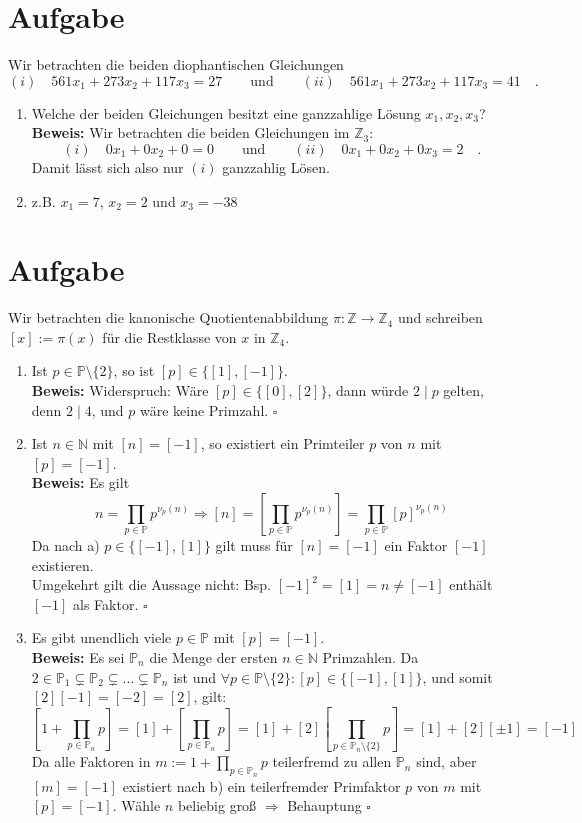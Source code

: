 \documentclass[12pt, a4paper]{article}
\newcommand{\ex}{\section{Aufgabe}}
\renewcommand{\P}{\mathbb{P}}
\begin{document}
	\ex
		Wir betrachten die beiden diophantischen Gleichungen
		\[
			(i)\quad 561x_1 + 273x_2 + 117x_3 = 27 \qquad \text{und} \qquad (ii)\quad 561x_1 + 273x_2 + 117x_3 = 41\quad.
		\]
		\begin{enumerate}[label=\alph*), labelwidth=!, labelindent=0pt]
			\item Welche der beiden Gleichungen besitzt eine ganzzahlige Lösung $x_1, x_2, x_3$?\\
				\textbf{Beweis:} Wir betrachten die beiden Gleichungen im $\mathbb{Z}_3$:
				\[
					(i)\quad 0x_1 + 0x_2 + 0 = 0 \qquad \text{und} \qquad (ii) \quad  0x_1 + 0x_2 + 0x_3 = 2\quad.
				\]
				Damit lässt sich also nur $(i)$ ganzzahlig Lösen.
			\item z.B. $x_1 = 7$, $x_2 = 2$ und $x_3 = -38$
		\end{enumerate}

	\ex
		Wir betrachten die kanonische Quotientenabbildung $\pi : \mathbb{Z} \to \mathbb{Z}_4$ und schreiben $[x] := \pi(x)$  für die Restklasse von $x$ in $\mathbb{Z}_4$.
		\begin{enumerate}[label=\alph*), labelwidth=!, labelindent=0pt]
			\item Ist $p \in \P \setminus \{2\}$, so ist $[p] \in \{[1], [-1]\}$.\\
			\textbf{Beweis:} Widerspruch: Wäre $[p] \in \{[0], [2]\}$, dann würde $2 \mid p$ gelten, denn $2 \mid 4$, und $p$ wäre keine Primzahl. \hfill $\square$
			\item Ist $n \in \mathbb{N}$ mit $[n] = [-1]$, so existiert ein Primteiler $p$ von $n$ mit $[p] = [-1]$.\\
			\textbf{Beweis:} Es gilt
			\[
				n = \prod_{p\in\P} p^{\nu_p(n)} \Rightarrow [n] = \left[\prod_{p\in\P} p^{\nu_p(n)}\right] = \prod_{p\in\P} [p]^{\nu_p(n)}
			\]
			Da nach a) $p \in \{[-1], [1]\}$ gilt muss für $[n] = [-1]$ ein Faktor $[-1]$ existieren.\\
			Umgekehrt gilt die Aussage nicht: Bsp. $[-1]^2 = [1] = n \neq [-1]$ enthält $[-1]$ als Faktor. \hfill $\square$
			\item Es gibt unendlich viele $p\in\P$ mit $[p] = [-1]$.\\
			\textbf{Beweis:} Es sei $\P_n$ die Menge der ersten $n \in \mathbb{N}$ Primzahlen. Da $2 \in \P_1 \subsetneq \P_2 \subsetneq \dots \subsetneq\P_n$ ist und $\forall p \in \P \setminus \{2\} : [p] \in \{[-1], [1]\}$, und somit $[2][-1] = [-2] = [2]$, gilt:
				\[
					\left[1 + \prod_{p\in\P_n}p\right] = [1] + \left[\prod_{p\in\P_n}p\right] = [1] + [2]\left[\prod_{p\in\P_n\setminus\{2\}}p\right] = [1] + [2][\pm1] = [-1]
				\]
				Da alle Faktoren in $m := 1 + \prod_{p\in\P_n}p$ teilerfremd zu allen $\P_n$ sind, aber $[m] = [-1]$ existiert nach b) ein teilerfremder Primfaktor $p$ von $m$ mit $[p] = [-1]$. Wähle $n$ beliebig groß $\Rightarrow$ Behauptung \hfill $\square$
		\end{enumerate}
\end{document}
